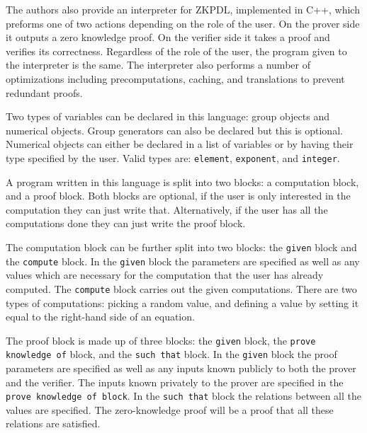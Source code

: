 \documentclass{sig-alternate}
\begin{document}
		The authors also provide an interpreter for ZKPDL, implemented in C++, which
		preforms one of two actions depending on the role of the user. On the prover
		side it outputs a zero knowledge proof. On the verifier side it takes a proof
		and verifies its correctness. Regardless of the role of the user, the program
		given to the interpreter is the same. The interpreter also performs a number of
		optimizations including precomputations, caching, and translations to prevent
		redundant proofs. 

		Two types of variables can be declared in this language: group objects
		and numerical objects. Group generators can also be declared but this 
		is optional. Numerical objects can either be declared in a list of variables
		or by having their type specified by the user. Valid types are: \texttt{element},
		\texttt{exponent}, and \texttt{integer}. 		
		
		A program written in this language is split into two blocks: a computation block,
		and a proof block. Both blocks are optional, if the user is only interested in the
		computation they can just write that. Alternatively, if the user has all the computations
		done they can just write the proof block. 
		
		The computation block can be further split into two blocks: the \texttt{given} block
		and the \texttt{compute} block. In the \texttt{given} block the parameters are specified
		as well as any values which are necessary for the computation that the user has already
		computed. The \texttt{compute} block carries out the given computations. There are two
		types of computations: picking a random value, and defining a value by setting it
		equal to the right-hand side of an equation.
		
		The proof block is made up of three blocks: the \texttt{given} block, the 
		\texttt{prove knowledge of} block, and the \texttt{such that} block. In the
		\texttt{given} block the proof parameters are specified as well as any inputs
		known publicly to both the prover and the verifier. The inputs known privately to
		the prover are specified in the \texttt{prove knowledge of block}. In the 
		\texttt{such that} block the relations between all the values are specified.
		The zero-knowledge proof will be a proof that all these relations are satisfied.
		
\end{document}
